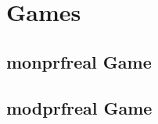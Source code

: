 \documentclass[a4paper]{article}
\begin{document}
\section{Games}
\subsection{monprfreal Game}
\begin{center}

\end{center}
\begin{center}
\begin{pchstack}

\pchspace

\end{pchstack}
\end{center}
\subsection{modprfreal Game}
\begin{center}

\end{center}
\begin{center}
\begin{pchstack}

\pchspace

\end{pchstack}
\end{center}
%
%
%
%
%
%
\end{document}

